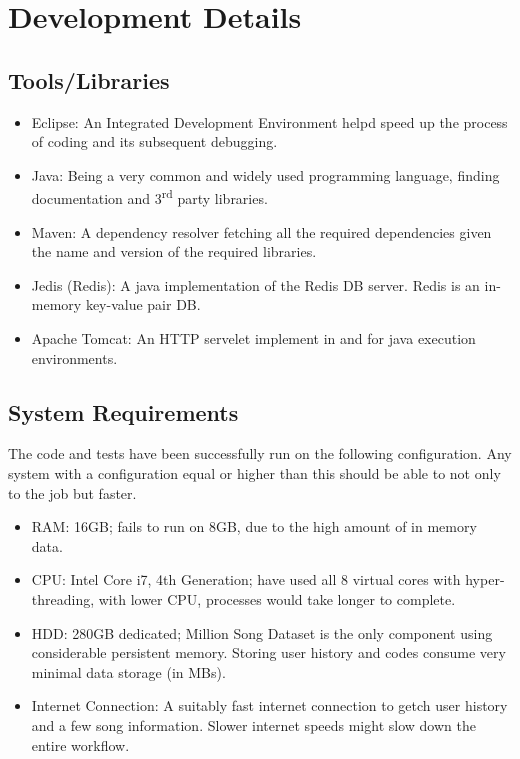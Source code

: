 \chapter{Development Details}
	\section{Tools/Libraries}
\begin{itemize}
	\item Eclipse: An Integrated Development Environment helpd speed up the process of coding and its subsequent debugging.
	\item Java: Being a very common and widely used programming language, finding documentation and 3\textsuperscript{rd} party libraries.
	\item Maven: A dependency resolver fetching all the required dependencies given the name and version of the required libraries.
	\item Jedis (Redis): A java implementation of the Redis DB server. Redis is an in-memory key-value pair DB.
	\item Apache Tomcat: An HTTP servelet implement in and for java execution environments.
\end{itemize}

	\section{System Requirements}
		The code and tests have been successfully run on the following configuration. Any system with a configuration equal or higher than this should be able to not only to the job but faster.
\begin{itemize}
	\item RAM: 16GB; fails to run on 8GB, due to the high amount of in memory data.
	\item CPU: Intel Core i7, 4th Generation; have used all 8 virtual cores with hyper-threading, with lower CPU, processes would take longer to complete.
	\item HDD: 280GB dedicated; Million Song Dataset is the only component using considerable persistent memory. Storing user history and codes consume very minimal data storage (in MBs).
	\item Internet Connection: A suitably fast internet connection to getch user history and a few song information. Slower internet speeds might slow down the entire workflow.
\end{itemize}

